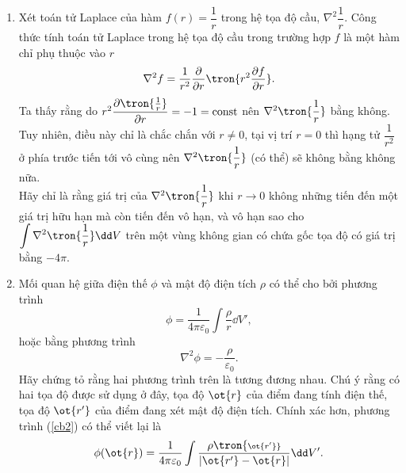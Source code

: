  \begin{vd}
    \begin{enumerate}[1)]
    \setlength{\itemsep}{0pt}
        \item Xét toán tử Laplace của hàm $f(r)=\dfrac{1}{r}$ trong hệ tọa độ cầu, $\nabla^2\dfrac{1}{r}$. Công thức tính toán tử Laplace trong hệ tọa độ cầu trong trường hợp $f$ là một hàm chỉ phụ thuộc vào $r$
        $$\nabla^2f=\dfrac{1}{r^2}\dfrac{\partial}{\partial r}\tron{r^2\dfrac{\partial f}{\partial r}}.$$
        Ta thấy rằng do  $r^2\dfrac{\partial\tron{\frac{1}{r}}}{\partial r}=-1=\mathrm{const}$ nên $\nabla^2\tron{\dfrac{1}{r}}$ bằng không. Tuy nhiên, điều này chỉ là chắc chắn với $r\neq 0$, tại vị trí $r=0$ thì hạng tử $\dfrac{1}{r^2}$ ở phía trước tiến tới vô cùng nên $\nabla^2\tron{\dfrac{1}{r}}$ (có thể) sẽ không bằng không nữa.\\
        Hãy chỉ là rằng giá trị của $\nabla^2\tron{\dfrac{1}{r}}$ khi $r\rightarrow0$ không những tiến đến một giá trị hữu hạn mà còn tiến đến vô hạn, và vô hạn sao cho $\displaystyle\int\nabla^2\tron{\dfrac{1}{r}} \dd V$ trên một vùng không gian có chứa gốc tọa độ có giá trị bằng $-4\pi$.
        \item Mối quan hệ giữa điện thế $\phi$ và mật độ điện tích $\rho$ có thể cho bởi phương trình
        \begin{equation}
            \displaystyle \phi=\dfrac{1}{4\pi\varepsilon_0}\int\dfrac{\rho}{r}\dd V',
            \label{cb2}
        \end{equation}
         hoặc bằng phương trình 
         \begin{equation}
            \displaystyle \nabla^2 \phi=-\dfrac{\rho}{\varepsilon_0}.
         \end{equation} 
         Hãy chứng tỏ rằng hai phương trình trên là tương đương nhau. Chú ý rằng có hai tọa độ được sử dụng ở đây, tọa độ $\ot{r}$ của điểm đang tính điện thế, tọa độ $\ot{r'}$ của điểm đang xét mật độ điện tích. Chính xác hơn, phương trình (\ref{cb2}) có thể viết lại là
         \begin{equation}
             \phi(\ot{r})=\dfrac{1}{4\pi \varepsilon_0}\int\dfrac{\rho\tron{\scriptstyle \ot{r'}}}{\left|\ot{r'}-\ot{r}\right|}\dd V'.
         \end{equation}
    \end{enumerate}
    \end{vd}
